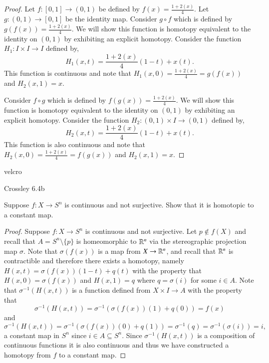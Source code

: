 \documentclass{homework651}
\begin{document}
\begin{problems}
\begin{proof} 
    Let $f: [0, 1] \to (0, 1)$ be defined by $f(x) = \frac{1 + 2(x)}{4}$. Let $g: (0, 1) \to [0, 1]$ be the 
    identity map. 
    Consider $g \circ f$ which is defined by $g(f(x)) = \frac{1 + 2(x)}{4}$. We will show this function is homotopy equivalent 
    to the identity on $(0, 1)$ by exhibiting an explicit homotopy. Consider the function $H_1: I \times I \to I$ defined by, 
    \begin{equation*}
        H_1(x, t) = \frac{1 + 2(x)}{4}(1 - t) + x(t).
    \end{equation*}
    This function is continuous and note that $H_1(x, 0) =  \frac{1 + 2(x)}{4} = g(f(x))$ and $H_2(x, 1) = x$. 

    Consider $f \circ g$ which is defined by $f(g(x)) = \frac{1 + 2(x)}{4}$. We will show this function is homotopy equivalent 
    to the identity on $(0, 1)$ by exhibiting an explicit homotopy. Consider the function $H_2: (0, 1) \times I \to (0, 1)$ defined by,
    \begin{equation*}
        H_2(x, t) = \frac{1 + 2(x)}{4}(1 - t) + x(t).
    \end{equation*}
    This function is also continuous and note that $H_2(x, 0) =  \frac{1 + 2(x)}{4} = f(g(x))$ and $H_2(x, 1) = x$. 
\end{proof}


velcro



\newpage
\problem Crossley 6.4b

Suppose $f:X\rightarrow S^n$ is continuous and not surjective.
Show that it is homotopic to a constant map.
\begin{proof} Suppose $f:X\rightarrow S^n$ is continuous and not surjective. Let $p \not\in f(X)$ and 
    recall that $A = S^n\setminus \{p\}$ is homeomorphic to $\mathbb R^n$ via the 
    stereographic projection map $\sigma$. Note that $\sigma(f(x))$ is a map from $X \to \mathbb R^n$, and recall that 
    $\mathbb R^n$ is contractible and therefore there exists a homotopy, namely $H(x, t) = \sigma(f(x))(1 - t) + q(t)$ with the property that 
    $H(x, 0) = \sigma(f(x))$ and $H(x, 1) = q$ where $q = \sigma(i)$ for some $i \in A$. Note that $\sigma^{-1}(H(x, t))$ is a function 
    defined from $X \times I \to A$ with the property that 
    \begin{equation*}
        \sigma^{-1}(H(x,t)) = \sigma^{-1}(\sigma(f(x))(1) + q(0)) = f(x)
    \end{equation*}
     and
     \begin{equation*}
        \sigma^{-1}(H(x,t)) = \sigma^{-1}(\sigma(f(x))(0) + q(1)) = \sigma^{-1}(q) = \sigma^{-1}(\sigma(i)) = i,
     \end{equation*}
    a constant map in $S^n$ since $i \in A \subseteq S^n$. 
    Since $\sigma^{-1}(H(x, t))$ is a composition of continuous functions it is also continuous and thus we have constructed 
    a homotopy from $f$ to a constant map. 
\end{proof}








\end{problems}
\end{document}

